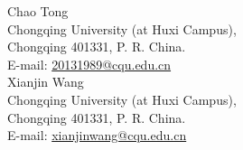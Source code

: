 \documentclass{article}
\theoremstyle{plain}
\theoremstyle{definition}
\theoremstyle{remark}
\begin{document}
	
	
	
	\noindent  Chao Tong  \\
	Chongqing University (at Huxi Campus),\\
	Chongqing 401331, P. R. China.\\
	E-mail: \url{20131989@cqu.edu.cn}\\
	
	\noindent  Xianjin Wang \\
	Chongqing University (at Huxi Campus),\\
	Chongqing 401331, P. R. China.\\
	E-mail: \url{xianjinwang@cqu.edu.cn}\\
	
\end{document}
